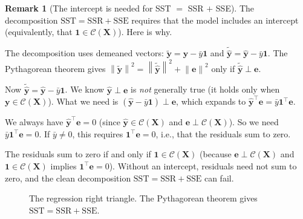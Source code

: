\documentclass[11pt,a4paper]{article}
\theoremstyle{plain}
\theoremstyle{definition}
\newtheorem{remark}[theorem]{Remark}
\newcommand{\yhat}{\hat{\bm{y}}}
\newcommand{\bX}{\bm{X}}
\newcommand{\by}{\bm{y}}
\newcommand{\be}{\bm{e}}
\newcommand{\Col}{\mathcal{C}}
\newcommand{\norm}[1]{\left\lVert #1 \right\rVert}
\begin{document}
\begin{remark}[The intercept is needed for SST $=$ SSR $+$ SSE]\label{rem:intercept-decomp}
The decomposition $\text{SST} = \text{SSR} + \text{SSE}$ requires that the
model includes an intercept (equivalently, that $\bm{1}\in\Col(\bX)$).
Here is why.

The decomposition uses demeaned vectors: $\tilde{\by} = \by - \bar{y}\bm{1}$
and $\tilde{\yhat} = \yhat - \bar{y}\bm{1}$.  The Pythagorean theorem gives
$\norm{\tilde{\by}}^2 = \norm{\tilde{\yhat}}^2 + \norm{\be}^2$
only if $\tilde{\yhat}\perp\be$.

Now $\tilde{\yhat} = \yhat - \bar{y}\bm{1}$.
We know $\yhat\perp\be$ is \emph{not} generally true (it holds only when
$\by\in\Col(\bX)$).
What we need is $(\yhat - \bar{y}\bm{1})\perp\be$, which expands to
$\yhat^\top\be = \bar{y}\bm{1}^\top\be$.

We always have $\yhat^\top\be = 0$ (since $\yhat\in\Col(\bX)$ and
$\be\perp\Col(\bX)$).  So we need $\bar{y}\bm{1}^\top\be = 0$.
If $\bar{y}\ne 0$, this requires $\bm{1}^\top\be = 0$, i.e., that the
residuals sum to zero.

The residuals sum to zero if and only if $\bm{1}\in\Col(\bX)$
(because $\be\perp\Col(\bX)$ and $\bm{1}\in\Col(\bX)$ implies
$\bm{1}^\top\be = 0$).
Without an intercept, residuals need not sum to zero, and the clean
decomposition $\text{SST} = \text{SSR} + \text{SSE}$ can fail.
\end{remark}

\begin{figure}[h]
\centering
{}
\caption{The regression right triangle. The Pythagorean theorem gives
$\text{SST}=\text{SSR}+\text{SSE}$.}
\end{figure}
\end{document}
